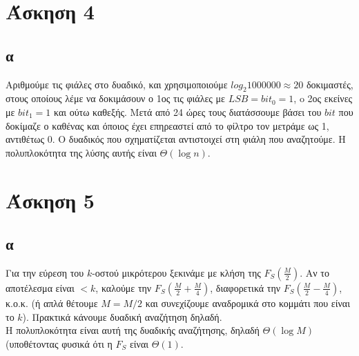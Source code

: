 \documentclass[12pt,a4paper]{article}
\begin{document}
  \section{Άσκηση 4}

  \subsection{α}
    Αριθμούμε τις φιάλες στο δυαδικό, και χρησιμοποιούμε \(log_{2}{1000000}
    \approx 20 \) δοκιμαστές, στους οποίους λέμε να δοκιμάσουν ο 1ος τις φιάλες
    με \(LSB=bit_{0}=1\), o 2ος εκείνες με \(bit_{1}=1\) και ούτω καθεξής.
    Μετά από 24 ώρες τους διατάσσουμε βάσει του \(bit\) που δοκίμαζε ο καθένας
    και όποιος έχει επηρεαστεί από το φίλτρο τον μετράμε ως 1, αντιθέτως 0.
    Ο δυαδικός που σχηματίζεται αντιστοιχεί στη φιάλη που αναζητούμε. Η 
    πολυπλοκότητα της λύσης αυτής είναι \( \Theta(\log{n}) \).
  
  \section{Άσκηση 5}

  \subsection{α}
    Για την εύρεση του \( k \)-οστού μικρότερου ξεκινάμε με κλήση της 
    \( F_S{(\frac{M}{2})} \). Αν το αποτέλεσμα είναι \( <k \), καλούμε
    την \( F_S{(\frac{M}{2} + \frac{M}{4})} \), διαφορετικά την
    \( F_S{(\frac{M}{2} - \frac{M}{4})} \), κ.ο.κ. (ή απλά θέτουμε
    \( M=M/2 \) και συνεχίζουμε αναδρομικά στο κομμάτι που είναι το \( k \)).
    Πρακτικά κάνουμε δυαδική αναζήτηση δηλαδή.\\
    Η πολυπλοκότητα είναι αυτή της δυαδικής αναζήτησης, δηλαδή
    \( \Theta(\log{M}) \) (υποθέτοντας φυσικά ότι η \( F_S \) είναι 
    \( \Theta(1) \).
  
\end{document}
